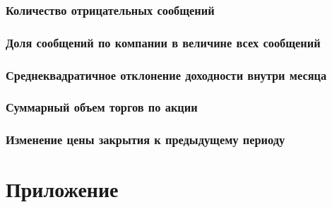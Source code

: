 \documentclass{article}
\begin{document}
\subsubsection{Количество отрицательных сообщений}
\subsubsection{Доля сообщений по компании в величине всех сообщений}
\subsubsection{Среднеквадратичное отклонение доходности внутри месяца}
\subsubsection{Суммарный объем торгов по акции}
\subsubsection{Изменение цены закрытия к предыдущему периоду}



\newpage
\section{Приложение}


\label{chap:additional}
\end{document}
